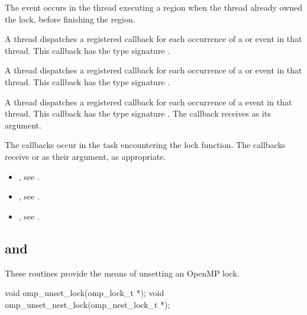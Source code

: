 The  event occurs in the thread
executing a  region
when the thread already owned the lock,
before finishing the region.


\tools

A thread dispatches a registered 
callback for each occurrence of a  or  event
in that thread.  This callback has the type signature .

A thread dispatches a registered 
callback for each occurrence of a  or  event
in that thread.  This callback has the type signature .

A thread dispatches a registered 
callback for each occurrence of a  event
in that thread. This callback has the type signature .
The callback receives  as its  argument.

The callbacks occur in the task encountering
the lock function.  The callbacks receive  or
  as their  argument, as appropriate.


\crossreferences
\begin{itemize}
\item {}, see
.
\item {}, see
.
\item {}, see
.
\end{itemize}




\subsection{ and }
\label{subsec:omp_unset_lock and omp_unset_nest_lock}
\summary
These routines provide the means of unsetting an OpenMP lock.

\format
\begin{ccppspecific}
\begin{ompcFunction}
void omp_unset_lock(omp_lock_t *);
void omp_unset_nest_lock(omp_nest_lock_t *);
\end{ompcFunction}
\end{ccppspecific}


